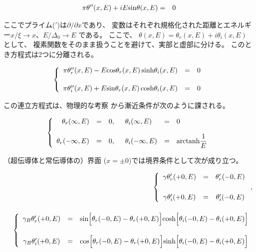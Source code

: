 \documentclass[uplatex,a4j,12pt,dvipdfmx]{jsarticle}
\begin{document}
\begin{eqnarray}
	\pi
	\theta''(x,E)
	+
	i E {\rm sin} \theta(x,E)
	&=&
	0
\end{eqnarray}

ここでプライム($'$)は$\partial/\partial x$であり、
変数はそれぞれ規格化された距離とエネルギー$
	x/ \xi \to x$、$ E/\Delta_{0} \to E $
である。
ここで、
$\theta(x,E) = \theta_{r}(x,E) +i \theta_{i}(x,E)$
として、
複素関数をそのまま扱うことを避けて、実部と虚部に分ける。
このとき方程式は2つに分離される。

\begin{eqnarray}
	\left\{
	\begin{array}{rcl}
		\pi \theta_{r}''(x,E)
		-
		E {\rm cos} \theta_{r}(x,E) \ \! {\rm sinh} \theta_{i}(x,E)
		 & = &
		0
		\\[5mm]
		\pi \theta_{i}''(x,E)
		+
		E {\rm sin} \theta_{r}(x,E) \ \! {\rm cosh} \theta_{i}(x,E)
		 & = &
		0
	\end{array}
	\right.
\end{eqnarray}

この連立方程式は、物理的な考察
から漸近条件が次のように課される。

\begin{eqnarray}
	\left\{
	\begin{array}{rclll}
		\theta_{r}(\infty,E)
		                                     & = &
		0
		, \hspace{5mm} \theta_{i}(\infty,E)  &
		=                                    &
		0
		\\[4mm]
		\theta_{r}(-\infty,E)
		                                     & = &
		0
		, \hspace{5mm} \theta_{i}(-\infty,E) &
		=
		                                     &
		{\rm arctanh} \dfrac{1}{ E }
	\end{array}
	\right.
\end{eqnarray}

（超伝導体と常伝導体の）界面
($x=\pm0$)では境界条件として次が成り立つ。

\begin{eqnarray}
	&&
	\left\{
	\begin{array}{clc}
		\gamma
		\theta_{r}'(+0,E)
		 & = &
		\theta_{r}'(-0,E)
		\\[6mm]
		\gamma
		\theta_{i}'(+0,E)
		 & = &
		\theta_{i}'(-0,E)
	\end{array}
	\right.
	,
	\\[4mm]
	&&
	\left\{
	\begin{array}{clc}
		\gamma_{B}
		\theta_{r}'(+0,E)
		 & = &
		{\rm sin} \Big[ \theta_{r}(-0,E) - \theta_{r}(+0,E) \Big]
		{\rm cosh} \Big[ \theta_{i}(-0,E) - \theta_{i}(+0,E) \Big]
		\\[6mm]
		\gamma_{B}
		\theta_{i}'(+0,E)
		 & = &
		{\rm cos} \Big[ \theta_{r}(-0,E) - \theta_{r}(+0,E) \Big]
		{\rm sinh} \Big[ \theta_{i}(-0,E) - \theta_{i}(+0,E) \Big]
	\end{array}
	\right.
\end{eqnarray}
\end{document}
